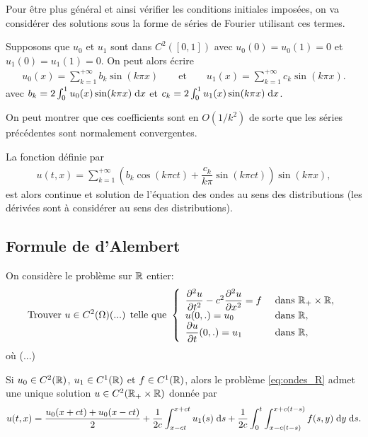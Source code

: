 \documentclass[12pt,a4paper,twoside]{article}
\begin{document}
Pour \^etre plus g\'en\'eral et ainsi v\'erifier les conditions initiales impos\'ees,
on va consid\'erer des solutions 
sous la forme de s\'eries de Fourier utilisant ces termes.

Supposons que $u_0$ et $u_1$ sont dans $C^{2}([0,1])$
avec $u_0(0) = u_0(1) = 0$
et $u_1(0) = u_1(1) = 0$.
On peut alors \'ecrire
\begin{align*}
  u_0(x) = \sum\limits_{k=1}^{+\infty} b_k \sin (k \pi x)
  \qquad \text{et} \qquad
  u_1(x) = \sum\limits_{k=1}^{+\infty} c_k \sin (k \pi x) .
\end{align*}
avec $b_k = 2 \int_0^1 u_0(x) \sin(k \pi x) \;\mathrm{d} x$
et $c_k = 2 \int_0^1 u_1(x) \sin(k \pi x) \;\mathrm{d} x$.

On peut montrer que ces coefficients sont en $O(1/k^2)$ de sorte que les s\'eries
pr\'ec\'edentes sont normalement convergentes.

La fonction d\'efinie par
\begin{align*}
  u(t,x) = \sum\limits_{k=1}^{+\infty} ( b_k \cos(k \pi c t) + \dfrac{c_k}{k \pi} \sin(k \pi c t) ) 
  \sin(k \pi x) ,
\end{align*}
est alors continue et solution de l'\'equation des ondes au sens des distributions
(les d\'eriv\'ees sont \`a consid\'erer au sens des distributions).

\subsection{Formule de d'Alembert}

On consid\`ere le probl\`eme sur $\mathbb{R}$ entier:
\begin{equation}
  \label{eq:ondes_R}
  \text{Trouver $u \in C^2(\Omega)$(...) telle que  }
  \left\{
    \begin{array}{l l}
      \dfrac{\partial^2 u}{\partial t^2} - c^2 \dfrac{\partial^2 u}{\partial x^2} = f 
      &\text{ dans } \mathbb{R}_+ \times \mathbb{R} ,
      \\
      u(0,.) = u_0 
      & \text{ dans } \mathbb{R} ,
      \\
      \dfrac{\partial u}{\partial t}(0,.) = u_1 
      & \text{ dans } \mathbb{R} ,
    \end{array}
  \right.
\end{equation}
o\`u (...)


\begin{theorem}
  \label{thm:d_Alembert}
  Si $u_0 \in C^2(\mathbb{R})$, $u_1 \in C^1(\mathbb{R})$ et $f \in C^1(\mathbb{R})$,
  alors le probl\`eme \eqref{eq:ondes_R} admet une unique solution 
  $u \in C^2(\mathbb{R}_+ \times \mathbb{R})$ donn\'ee par 
  \begin{align*}
    u(t,x) = \dfrac{u_0(x+ct) + u_0(x-ct)}{2} 
    + \dfrac{1}{2c} \int_{x-ct}^{x+ct} u_1(s) \;\mathrm{d} s
    + \dfrac{1}{2c} \int_0^t \int_{x - c(t-s)}^{x+c(t-s)} f(s,y) \;\mathrm{d} y \;\mathrm{d} s .
  \end{align*}
\end{theorem}
\end{document}
